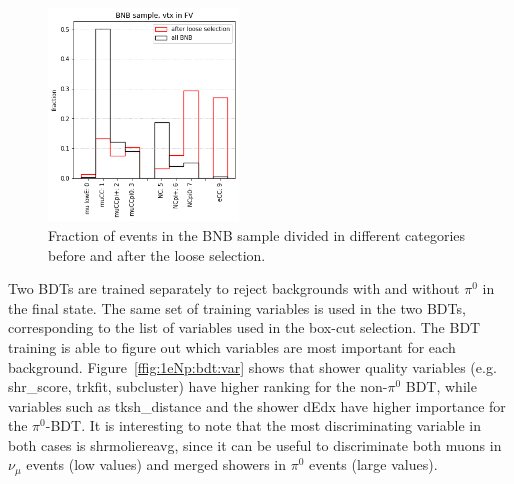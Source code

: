 \documentclass[a4paper]{article}
\begin{document}
\begin{figure}[H]
\begin{center}
\includegraphics[width=0.45\textwidth]{1eNp/loose_sel_perf.png}
\caption{\label{fig:1eNp:loosesel} Fraction of events in the BNB sample divided in different categories before and after the loose selection.}
\end{center}
\end{figure}

Two BDTs are trained separately to reject backgrounds with and without $\pi^0$ in the final state. The same set of training variables is used in the two BDTs, corresponding to the list of variables used in the box-cut selection. The BDT training is able to figure out which variables are most important for each background. Figure~\ref{ffig:1eNp:bdt:var} shows that shower quality variables (e.g. shr\_score, trkfit, subcluster) have higher ranking for the non-$\pi^0$ BDT, while variables such as tksh\_distance and the shower dEdx have higher importance for the $\pi^0$-BDT. It is interesting to note that the most discriminating variable in both cases is shrmoliereavg, since it can be useful to discriminate both muons in $\nu_\mu$ events (low values) and merged showers in $\pi^0$ events (large values).
\end{document}
